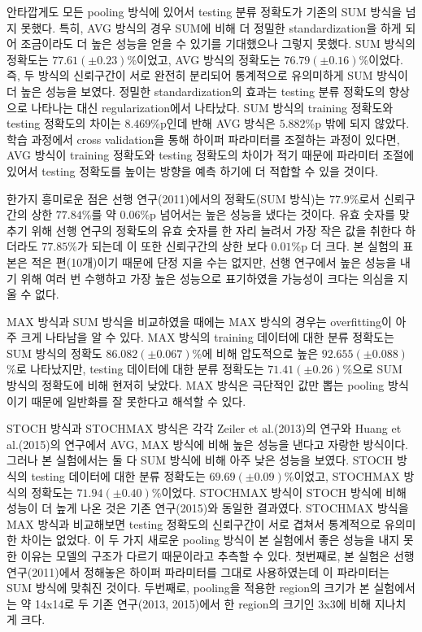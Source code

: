 \documentclass[a4paper,9pt,hidelinks]{article}
\begin{document}
\begin{multicols*}{2}
안타깝게도 모든 pooling 방식에 있어서 testing 분류 정확도가 기존의 SUM 방식을 넘지 못했다.
특히, AVG 방식의 경우 SUM에 비해 더 정밀한 standardization을 하게 되어 조금이라도 더 높은 성능을 얻을 수 있기를 기대했으나 그렇지 못했다.
SUM 방식의 정확도는 $77.61(\pm 0.23)$\%이었고, AVG 방식의 정확도는 $76.79(\pm 0.16)$\%이었다.
즉, 두 방식의 신뢰구간이 서로 완전히 분리되어 통계적으로 유의미하게 SUM 방식이 더 높은 성능을 보였다.
정밀한 standardization의 효과는 testing 분류 정확도의 향상으로 나타나는 대신 regularization에서 나타났다.
SUM 방식의 training 정확도와 testing 정확도의 차이는 $8.469$\%p인데 반해 AVG 방식은 $5.882$\%p 밖에 되지 않았다.
학습 과정에서 cross validation을 통해 하이퍼 파라미터를 조절하는 과정이 있다면, AVG 방식이 training 정확도와 testing 정확도의 차이가 적기 때문에 파라미터 조절에 있어서 testing 정확도를 높이는 방향을 예측 하기에 더 적합할 수 있을 것이다.

한가지 흥미로운 점은 선행 연구(2011)에서의 정확도(SUM 방식)는 $77.9$\%로서 신뢰구간의 상한 $77.84$\%를 약 $0.06$\%p 넘어서는 높은 성능을 냈다는 것이다.
유효 숫자를 맞추기 위해 선행 연구의 정확도의 유효 숫자를 한 자리 늘려서 가장 작은 값을 취한다 하더라도 $77.85$\%가 되는데 이 또한 신뢰구간의 상한 보다 $0.01$\%p 더 크다.
본 실험의 표본은 적은 편(10개)이기 때문에 단정 지을 수는 없지만, 선행 연구에서 높은 성능을 내기 위해 여러 번 수행하고 가장 높은 성능으로 표기하였을 가능성이 크다는 의심을 지울 수 없다.

MAX 방식과 SUM 방식을 비교하였을 때에는 MAX 방식의 경우는 overfitting이 아주 크게 나타남을 알 수 있다.
MAX 방식의 training 데이터에 대한 분류 정확도는 SUM 방식의 정확도 $86.082(\pm 0.067)$\%에 비해 압도적으로 높은 $92.655(\pm 0.088)$\%로 나타났지만, testing 데이터에 대한 분류 정확도는 $71.41(\pm 0.26)$\%으로 SUM 방식의 정확도에 비해 현저히 낮았다.
MAX 방식은 극단적인 값만 뽑는 pooling 방식이기 때문에 일반화를 잘 못한다고 해석할 수 있다.

STOCH 방식과 STOCHMAX 방식은 각각 Zeiler et al.(2013)의 연구와 Huang et al.(2015)의 연구에서 AVG, MAX 방식에 비해 높은 성능을 낸다고 자랑한 방식이다.
그러나 본 실험에서는 둘 다 SUM 방식에 비해 아주 낮은 성능을 보였다.
STOCH 방식의 testing 데이터에 대한 분류 정확도는 $69.69(\pm 0.09)$\%이었고, STOCHMAX 방식의 정확도는 $71.94(\pm 0.40)$\%이었다.
STOCHMAX 방식이 STOCH 방식에 비해 성능이 더 높게 나온 것은 기존 연구(2015)와 동일한 결과였다.
STOCHMAX 방식을 MAX 방식과 비교해보면 testing 정확도의 신뢰구간이 서로 겹쳐서 통계적으로 유의미한 차이는 없었다.
이 두 가지 새로운 pooling 방식이 본 실험에서 좋은 성능을 내지 못한 이유는 모델의 구조가 다르기 때문이라고 추측할 수 있다.
첫번째로, 본 실험은 선행 연구(2011)에서 정해놓은 하이퍼 파라미터를 그대로 사용하였는데 이 파라미터는 SUM 방식에 맞춰진 것이다.
두번째로, pooling을 적용한 region의 크기가 본 실험에서는 약 14x14로 두 기존 연구(2013, 2015)에서 한 region의 크기인 3x3에 비해 지나치게 크다.


\end{multicols*}
\end{document}
